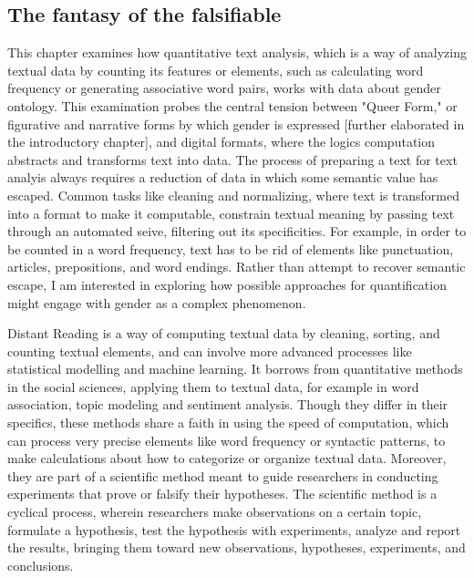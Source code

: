\documentclass[11pt]{article}
\begin{document}
\subsection{The fantasy of the falsifiable}
\label{sec:orgb446226}

This chapter examines how quantitative text analysis, which is a way
of analyzing textual data by counting its features or elements, such
as calculating word frequency or generating associative word pairs,
works with data about gender ontology. This examination probes the
central tension between "Queer Form," or figurative and narrative
forms by which gender is expressed [further elaborated in the
introductory chapter], and digital formats, where the logics
computation abstracts and transforms text into data. The process of
preparing a text for text analyis always requires a reduction of data
in which some semantic value has escaped. Common tasks like cleaning
and normalizing, where text is transformed into a format to make it
computable, constrain textual meaning by passing text through an
automated seive, filtering out its specificities. For example, in
order to be counted in a word frequency, text has to be rid of
elements like punctuation, articles, prepositions, and word
endings. Rather than attempt to recover semantic escape, I am
interested in exploring how possible approaches for quantification
might engage with gender as a complex phenomenon.

Distant Reading is a way of computing textual data by cleaning,
sorting, and counting textual elements, and can involve more advanced
processes like statistical modelling and machine learning. It borrows
from quantitative methods in the social sciences, applying them to
textual data, for example in word association, topic modeling and
sentiment analysis. Though they differ in their specifics, these
methods share a faith in using the speed of computation, which can
process very precise elements like word frequency or syntactic
patterns, to make calculations about how to categorize or organize
textual data. Moreover, they are part of a scientific method meant to
guide researchers in conducting experiments that prove or falsify
their hypotheses. The scientific method is a cyclical process, wherein
researchers make observations on a certain topic, formulate a
hypothesis, test the hypothesis with experiments, analyze and report
the results, bringing them toward new observations, hypotheses,
experiments, and conclusions.
\end{document}
